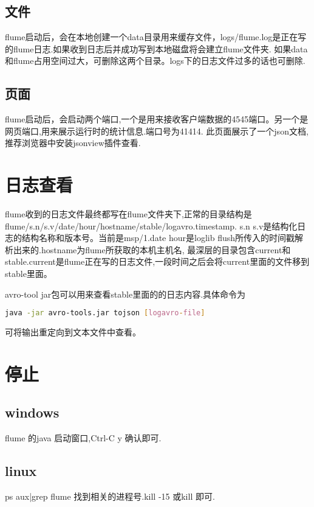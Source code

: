 \documentclass{article}
\begin{document}
\subsection{文件}
flume启动后，会在本地创建一个data目录用来缓存文件，logs/flume.log是正在写的flume日志.如果收到日志后并成功写到本地磁盘将会建立flume文件夹.
如果data和flume占用空间过大，可删除这两个目录。logs下的日志文件过多的话也可删除.
\subsection{页面}
flume启动后，会启动两个端口,一个是用来接收客户端数据的4545端口。另一个是网页端口,用来展示运行时的统计信息.端口号为41414.
此页面展示了一个json文档,推荐浏览器中安装jsonview插件查看.

\section{日志查看}
flume收到的日志文件最终都写在flume文件夹下,正常的目录结构是 flume/s.n/s.v/date/hour/hostname/stable/logavro.timestamp.
s.n s.v是结构化日志的结构名称和版本号。当前是msp/1.date hour是loglib flush所传入的时间戳解析出来的.hostname为flume所获取的本机主机名,
最深层的目录包含current和stable.current是flume正在写的日志文件,一段时间之后会将current里面的文件移到stable里面。

avro-tool jar包可以用来查看stable里面的的日志内容.具体命令为 \\
\begin{lstlisting}[language=BASH]
java -jar avro-tools.jar tojson [logavro-file]
\end{lstlisting}
可将输出重定向到文本文件中查看。 

\section{停止}
\subsection{windows}
flume 的java 启动窗口,Ctrl-C y 确认即可.
\subsection{linux}
ps aux|grep flume 找到相关的进程号.kill -15 或kill 即可.
\end{document}
